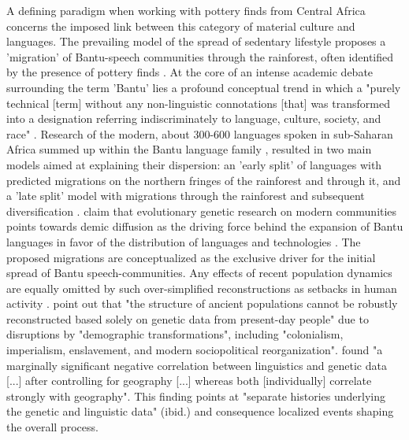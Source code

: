 \documentclass[smallextended,natbib]{svjour3}       %
\begin{document}
A defining paradigm when working with pottery finds from Central Africa concerns the imposed link between this category of material culture and languages. The prevailing model of the spread of sedentary lifestyle proposes a 'migration' of Bantu-speech communities through the rainforest, often identified by the presence of pottery finds \citep{Currie.2013,Bostoen.2015,Grollemund.2015,Koile.2022,Grollemund.2023}. At the core of an intense academic debate surrounding the term 'Bantu' \citep[cf.][]{Oliver.1966,Vansina.1979,Vansina.1980,Robertson.2000,Eggert.2005,Eggert.2016a} lies a profound conceptual trend in which a "purely technical [term] without any non-linguistic connotations [that] was transformed into a designation referring indiscriminately to language, culture, society, and race" \citep[302]{Eggert.2005}. Research of the modern, about 300-600 languages spoken in sub-Saharan Africa summed up within the Bantu language family \citep{Nurse.2003,Bostoen.2018}, resulted in two main models aimed at explaining their dispersion: an 'early split' of languages with predicted migrations on the northern fringes of the rainforest and through it, and a 'late split' model with migrations through the rainforest and subsequent diversification \citep{Bostoen.2018,Bostoen.2020}. \citet{Pakendorf.2011} claim that evolutionary genetic research on modern communities points towards demic diffusion as the driving force behind the expansion of Bantu languages in favor of the distribution of languages and technologies \citep{Bostoen.2022}. The proposed migrations are conceptualized as the exclusive driver for the initial spread of Bantu speech-communities. Any effects of recent population dynamics \citep[cf.][83]{Vennetier.1963} are equally omitted by such over-simplified reconstructions as setbacks in human activity \citep{Oslisly.1998,Oslisly.2013b,Saulieu.2017,deSaulieu.2021a,Seidensticker.2021}. \citet[1]{Lipson.2022} point out that "the structure of ancient populations cannot be robustly reconstructed based solely on genetic data from present-day people" due to disruptions by "demographic transformations", including "colonialism, imperialism, enslavement, and modern sociopolitical reorganization". \citet[7]{Fortes-Lima.2023a} found "a marginally significant negative correlation between linguistics and genetic data [...] after controlling for geography [...] whereas both [individually] correlate strongly with geography". This finding points at "separate histories underlying the genetic and linguistic data" (ibid.) and consequence localized events shaping the overall process.
\end{document}
